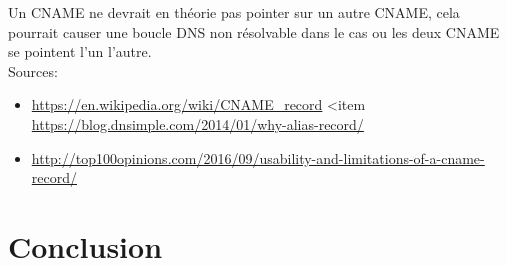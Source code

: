 \documentclass{article}
\begin{document}
Un CNAME ne devrait en théorie pas pointer sur un autre CNAME, cela pourrait causer une boucle DNS non résolvable dans le cas ou les deux CNAME se pointent l'un l'autre.\\

Sources:
\begin{itemize}
\item \url{https://en.wikipedia.org/wiki/CNAME_record}
<item \url{https://blog.dnsimple.com/2014/01/why-alias-record/}
\item \url{http://top100opinions.com/2016/09/usability-and-limitations-of-a-cname-record/}
\end{itemize}
\section{Conclusion}

\newpage

\printbibliography
\end{document}
